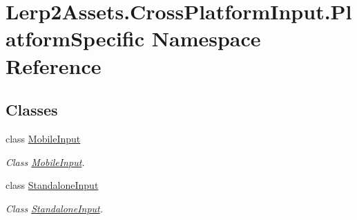 \hypertarget{namespace_lerp2_assets_1_1_cross_platform_input_1_1_platform_specific}{}\section{Lerp2\+Assets.\+Cross\+Platform\+Input.\+Platform\+Specific Namespace Reference}
\label{namespace_lerp2_assets_1_1_cross_platform_input_1_1_platform_specific}
\subsection*{Classes}
\begin{DoxyCompactItemize}
\item 
class \hyperlink{class_lerp2_assets_1_1_cross_platform_input_1_1_platform_specific_1_1_mobile_input}{Mobile\+Input}
\begin{DoxyCompactList}\small\item\em Class \hyperlink{class_lerp2_assets_1_1_cross_platform_input_1_1_platform_specific_1_1_mobile_input}{Mobile\+Input}. \end{DoxyCompactList}\item 
class \hyperlink{class_lerp2_assets_1_1_cross_platform_input_1_1_platform_specific_1_1_standalone_input}{Standalone\+Input}
\begin{DoxyCompactList}\small\item\em Class \hyperlink{class_lerp2_assets_1_1_cross_platform_input_1_1_platform_specific_1_1_standalone_input}{Standalone\+Input}. \end{DoxyCompactList}\end{DoxyCompactItemize}
